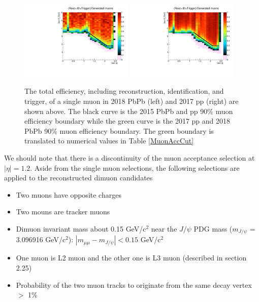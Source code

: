 \begin{figure}[h]
\begin{center}
\includegraphics[width= 0.48\textwidth]{Figures/Chapter4/MuonAccPbPb.pdf}
\includegraphics[width= 0.48\textwidth]{Figures/Chapter4/MuonAccPP.pdf}
\caption{The total efficiency, including reconstruction, identification, and trigger, of a single muon in 2018 PbPb (left) and 2017 pp (right) are shown above. The black curve is the 2015 PbPb and pp 90\% muon efficiency boundary while the green curve is the 2017 pp and 2018 PbPb 90\% muon efficiency boundary. The green boundary is translated to numerical values in Table \ref{MuonAccCut}}
\label{MuonAccPlot}
\end{center}
\end{figure}

We should note that there is a discontinuity of the muon acceptance selection at $|\eta| = 1.2$. Aside from the single muon selections, the following selections are applied to the reconstructed dimuon candidates


\begin{itemize}
\item Two muons have opposite charges 
\item Two mouns are tracker muons
\item Dimuon invariant mass about 0.15 GeV/c$^2$ near the $J/\psi$ PDG mass ($m_{J/\psi}$ = 3.096916 GeV/c$^2$): $|m_{\mu\mu} - m_{J/\psi}| < 0.15$ GeV/c$^2$
\item One muon is L2 muon and the other one is L3 muon (described in section 2.25)
\item Probability of the two muon tracks to originate from the same decay vertex $>$ 1\%
\end{itemize}


